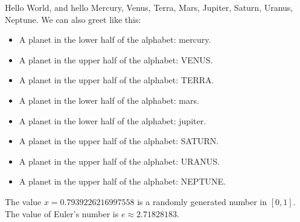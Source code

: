 \documentclass[a4paper]{report}
\begin{document}
    Hello World, and hello Mercury, Venus, Terra, Mars, Jupiter, Saturn, Uranus, Neptune. We can also greet like this:

    \begin{itemize}
    \item A planet in the lower half of the alphabet: mercury.
    \item A planet in the upper half of the alphabet: VENUS.
    \item A planet in the upper half of the alphabet: TERRA.
    \item A planet in the lower half of the alphabet: mars.
    \item A planet in the lower half of the alphabet: jupiter.
    \item A planet in the upper half of the alphabet: SATURN.
    \item A planet in the upper half of the alphabet: URANUS.
    \item A planet in the upper half of the alphabet: NEPTUNE.
    \end{itemize}

    The value $x=0.7939226216997558$ is a randomly generated number in $[0,1]$.
    The value of Euler's number is $e\approx2.71828183$.
\end{document}
